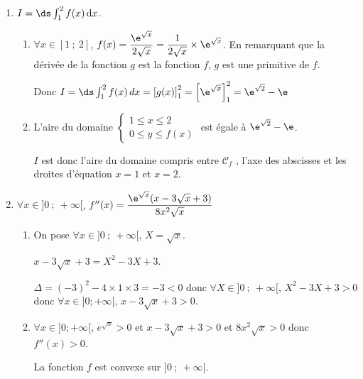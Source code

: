 \begin{enumerate}
\begin{enumerate}
À la calculatrice : $\alpha\approx 4,6$.
	\end{enumerate}
	\item $I = \ds\int_1^2 f(x) \, \text{d}x$.
	\begin{enumerate}
		\item $\forall x \in [1~;~2]$, $f(x)=\dfrac{\e^{\sqrt{x}}}{2 \sqrt{x}}=\dfrac{1}{2\sqrt{x}} \times {\e^{\sqrt{x}}}$.
En remarquant que la dérivée de la fonction $g$ est la fonction $f$, $g$ est une primitive de $f$.

Donc $I = \ds\int_1^2 f(x) \, dx=\left[g(x)\right]_1^2=\left[\e^{\sqrt{x}}\right]_1^2= \e^{\sqrt{2}}- \e$
		\item L'aire du domaine $\begin{cases} 1\leqslant x \leqslant 2 \\ 0\leqslant y \leqslant f(x)\end{cases}$ est égale à $\e^{\sqrt{2}}- \e$.
		
$I$ est donc l'aire du domaine compris entre $\mathcal{C}_f$ , l'axe des abscisses et les droites d'équation $x =1$ et $x =2$.
	\end{enumerate}
	\item $\forall x \in ]0~;~ +\infty[$, $f''(x) = \dfrac{\e^{\sqrt{x}} (x - 3 \sqrt{x} + 3)}{8 x^2 \sqrt{x}}$
	\begin{enumerate}
		\item On pose $\forall x \in ]0~;~ +\infty[$, $X=\sqrt{x}$.

$x - 3 \sqrt{x} + 3=X^2-3X+3$.

		$\Delta=(-3)^2-4\times 1\times 3=-3<0$ donc $\forall X \in ]0~;~ +\infty[$, $X^2-3X+3>0$ donc $\forall x \in ]0; +\infty[$, $x - 3 \sqrt{x} + 3>0$.
		\item $\forall x \in ]0; +\infty[$, $e^{\sqrt{x}}>0$ et $x - 3 \sqrt{x} + 3>0$ et $8 x^2 \sqrt{x}>0$ donc $f''(x)>0$.
		
		La fonction $f$ est convexe sur $]0~;~ +\infty[$.
	\end{enumerate}
\end{enumerate}
